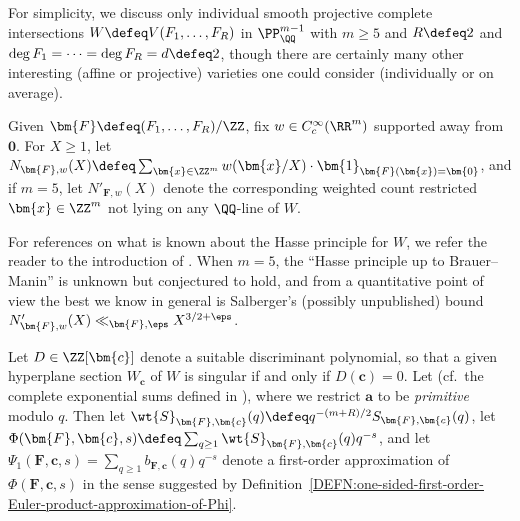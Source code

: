 \documentclass[12pt]{report}
\begin{document}

For simplicity,
we discuss only individual smooth projective complete intersections $W\defeq V(F_1,\dots,F_R)$ in $\PP^{m-1}_\QQ$ with $m\geq5$ and $R\defeq2$ and $\deg{F_1}=\dots=\deg{F_R}=d\defeq2$,
though there are certainly many other interesting (affine or projective) varieties one could consider (individually or on average).

Given $\bm{F}\defeq (F_1,\dots,F_R)/\ZZ$,
fix $w\in C^\infty_c(\RR^m)$ supported away from $\bm{0}$.
For $X\geq1$,
let $N_{\bm{F},w}(X)\defeq
\sum_{\bm{x}\in\ZZ^m}w(\bm{x}/X)
\cdot\bm{1}_{\bm{F}(\bm{x})=\bm{0}}$,
and if $m=5$,
let $N'_{\bm{F},w}(X)$ denote the corresponding weighted count restricted $\bm{x}\in\ZZ^m$ not lying on any $\QQ$-line of $W$.

For references on what is known about the Hasse principle for $W$,
we refer the reader to the introduction of \cite{vishe2019rational}.
When $m=5$,
the ``Hasse principle up to Brauer--Manin'' is unknown but conjectured to hold,
and from a quantitative point of view the best we know in general is Salberger's (possibly unpublished) bound
$N'_{\bm{F},w}(X)\ll_{\bm{F},\eps} X^{3/2+\eps}$.

Let $D\in\ZZ[\bm{c}]$ denote a suitable discriminant polynomial,
so that a given hyperplane section $W_{\bm{c}}$ of $W$ is singular if and only if $D(\bm{c})=0$.
Let
(cf.~the complete exponential sums defined in \cite{heath2017simultaneous}),
where we restrict $\bm{a}$ to be \emph{primitive} modulo $q$.
Then let $\wt{S}_{\bm{F},\bm{c}}(q)\defeq q^{-(m+R)/2}S_{\bm{F},\bm{c}}(q)$,
let $\Phi(\bm{F},\bm{c},s)\defeq
\sum_{q\geq1}\wt{S}_{\bm{F},\bm{c}}(q)q^{-s}$,
and let $\Psi_1(\bm{F},\bm{c},s)=\sum_{q\geq1}b_{\bm{F},\bm{c}}(q)q^{-s}$ denote a first-order approximation of $\Phi(\bm{F},\bm{c},s)$ in the sense suggested by Definition~\ref{DEFN:one-sided-first-order-Euler-product-approximation-of-Phi}.
\end{document}
